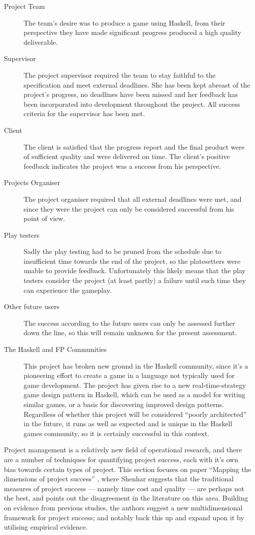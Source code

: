 \begin{description}
    \item[Project Team] The team's desire was to produce a game using Haskell, from their perspective they have made significant progress produced a high quality deliverable.
    \item[Supervisor] The project supervisor required the team to stay faithful to the specification and meet external deadlines. She has been kept abreast of the project's progress, no deadlines have been missed and her feedback has been incorporated into development throughout the project. All success criteria for the supervisor has been met.
    \item[Client] The client is satisfied that the progress report and the final product were of sufficient quality and were delivered on time. The client's positive feedback indicates the project was a success from his perspective.
    \item[Projects Organiser] The project organiser required that all external deadlines were met, and since they were the project can only be considered successful from his point of view.
    \item[Play testers] Sadly the play testing had to be pruned from the schedule due to insufficient time towards the end of the project, so the platesetters were unable to provide feedback. Unfortunately this likely means that the play testers consider the project (at least partly) a failure until such time they can experience the gameplay.
    \item[Other future users] The success according to the future users can only be assessed further down the line, so this will remain unknown for the present assessment.
    \item[The Haskell and FP Communities] This project has broken new ground in the Haskell community, since it's a pioneering effort to create a game in a language not typically used for game development. The project has given rise to a new real-time-strategy game design pattern in Haskell, which can be used as a model for writing similar games, or a basis for discovering improved design patterns. Regardless of whether this project will be considered ``poorly architected'' in the future, it runs as well as expected and is unique in the Haskell games community, so it is certainly successful in this context.
\end{description}

Project management is a relatively new field of operational research, and there are a number of techniques for quantifying project success, each with it's own bias towards certain types of project. This section focuses on paper ``Mapping the dimensions of project success'' \cite{shenhar}, where Shenhar suggests that the traditional measures of project success --- namely time cost and quality --- are perhaps not the best, and points out the disagreement in the literature on this area. Building on evidence from previous studies, the authors suggest a new multidimensional framework for project success; and notably back this up and expand upon it by utilising empirical evidence.

